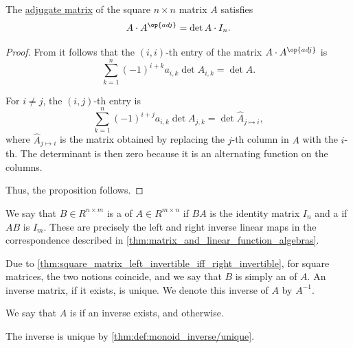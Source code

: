 \begin{proposition}\label{thm:inverse_via_adjunction}
  The \hyperref[def:adjugate_matrix]{adjugate matrix} of the square \( n \times n \) matrix \( A \) satisfies
  \begin{equation*}
    A \cdot A^{\op{adj}} = \det A \cdot I_n.
  \end{equation*}
\end{proposition}
\begin{proof}
  From  it follows that the \( (i, i) \)-th entry of the matrix \( A \cdot A^{\op{adj}} \) is
  \begin{equation*}
    \sum_{k=1}^n (-1)^{i + k} a_{i,k} \det A_{i,k}
    =
    \det A.
  \end{equation*}

  For \( i \neq j \), the \( (i, j) \)-th entry is
  \begin{equation*}
    \sum_{k=1}^n (-1)^{i + j} a_{i,k} \det A_{j,k}
    =
    \det \widehat A_{j \mapsto i},
  \end{equation*}
  where \( \widehat A_{j \mapsto i} \) is the matrix obtained by replacing the \( j \)-th column in \( A \) with the \( i \)-th. The determinant is then zero because it is an alternating function on the columns.

  Thus, the proposition follows.
\end{proof}

\begin{definition}\label{def:inverse_matrix}
  We say that \( B \in R^{n \times m} \) is a  of \( A \in R^{m \times n} \) if \( BA \) is the identity matrix \( I_n \) and a  if \( AB \) is \( I_m \). These are precisely the left and right inverse linear maps in the correspondence described in \cref{thm:matrix_and_linear_function_algebras}.

  Due to \cref{thm:square_matrix_left_invertible_iff_right_invertible}, for square matrices, the two notions coincide, and we say that \( B \) is simply an  of \( A \). An inverse matrix, if it exists, is unique. We denote this inverse of \( A \) by \( A^{-1} \).

  We say that \( A \) is  if an inverse exists, and  otherwise.
\end{definition}
\begin{defproof}
  The inverse is unique by \cref{thm:def:monoid_inverse/unique}.
\end{defproof}


